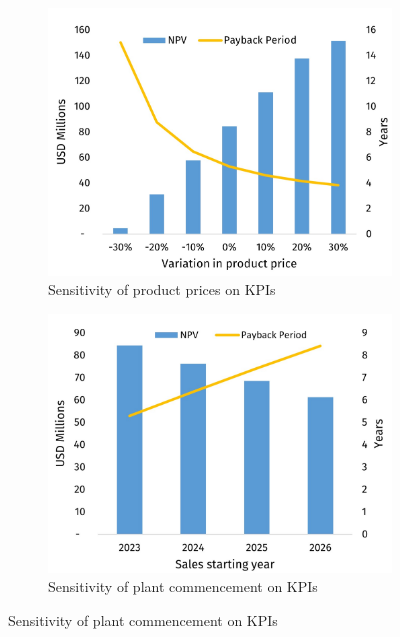\begin{figure}
\begin{subfigure}[b]{.45\linewidth}
\includegraphics[width=\linewidth]{chapters/6-economics/figures/Sensitivity_ProductPrice.jpg}
\caption{Sensitivity of product prices on KPIs}\label{Sensitivity_ProductPrice}
\end{subfigure}

\begin{subfigure}[b]{.45\linewidth}
\includegraphics[width=\linewidth]{chapters/6-economics/figures/Sensitivity_ProductionDelay.jpg}
\caption{Sensitivity of plant commencement on KPIs}\label{Sensitivity_ProductionDelay}
\end{subfigure}


\end{figure}

